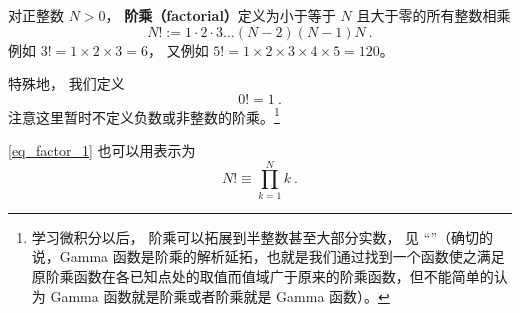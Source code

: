 
\begin{issues}
\issueDraft
\end{issues}


对正整数 $N > 0$， \textbf{阶乘（factorial）}定义为小于等于 $N$ 且大于零的所有整数相乘
\begin{equation}\label{eq_factor_1}
N! := 1 \cdot 2 \cdot 3 \dots (N - 2) (N - 1)N~.
\end{equation}
例如 $3! = 1\times 2\times 3 = 6$， 又例如 $5! = 1\times 2\times 3\times 4\times 5 = 120$。

特殊地， 我们定义
\begin{equation}
0! = 1~.
\end{equation}
注意这里暂时不定义负数或非整数的阶乘。\footnote{学习微积分以后， 阶乘可以拓展到半整数甚至大部分实数， 见 “”（确切的说，Gamma 函数是阶乘的解析延拓，也就是我们通过找到一个函数使之满足原阶乘函数在各已知点处的取值而值域广于原来的阶乘函数，但不能简单的认为 Gamma 函数就是阶乘或者阶乘就是 Gamma 函数）。}

\autoref{eq_factor_1} 也可以用表示为
\begin{equation}
N! \equiv \prod_{k = 1}^N k~.
\end{equation}
